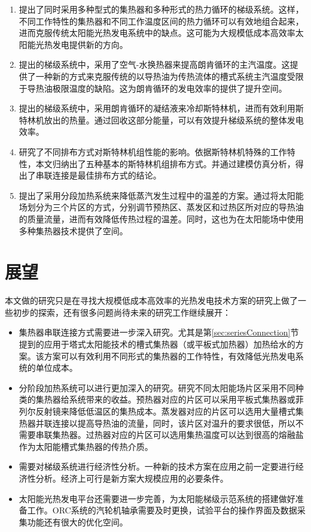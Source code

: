 \begin{enumerate}[label=(\arabic*)]
  \item 提出了同时采用多种型式的集热器和多种形式的热力循环的梯级系统。这样，不同工作特性的集热器和不同工作温度区间的热力循环可以有效地组合起来，进而克服传统太阳能光热发电系统中的缺点。这可能为大规模低成本高效率太阳能光热发电提供新的方向。
  \item 提出的梯级系统中，采用了空气-水换热器来提高朗肯循环的主汽温度。这提供了一种新的方式来克服传统的以导热油为传热流体的槽式系统主汽温度受限于导热油极限温度的缺陷。这为朗肯循环的发电效率的提供了提升空间。
  \item 提出的梯级系统中，采用朗肯循环的凝结液来冷却斯特林机，进而有效利用斯特林机放出的热量。通过回收这部分能量，可以有效提升梯级系统的整体发电效率。
  \item 研究了不同排布方式对斯特林机组性能的影响。依据斯特林机特殊的工作特性，本文归纳出了五种基本的斯特林机组排布方式。并通过建模仿真分析，得出了串联连接是最佳排布方式的结论。 
  \item 提出了采用分段加热系统来降低蒸汽发生过程中的温差的方案。通过将太阳能场划分为三个片区的方式，分别调节预热区、蒸发区和过热区所对应的导热油的质量流量，进而有效降低传热过程的温差。同时，这也为在太阳能场中使用多种集热器技术提供了空间。
\end{enumerate}

\section{展望}
本文做的研究只是在寻找大规模低成本高效率的光热发电技术方案的研究上做了一些初步的探索，还有很多问题尚待未来的研究工作继续展开：
\begin{itemize}
  \item 集热器串联连接方式需要进一步深入研究。尤其是第\ref{sec:seriesConnection}节提到的应用于塔式太阳能技术的槽式集热器（或平板式加热器）加热给水的方案。该方案可以有效利用不同形式的集热器的工作特性，有效降低光热发电系统的单位成本。
  \item 分阶段加热系统可以进行更加深入的研究。研究不同太阳能场片区采用不同种类的集热器给系统带来的收益。预热器对应的片区可以采用平板式集热器或菲列尔反射镜来降低低温区的集热成本。蒸发器对应的片区可以选用大量槽式集热器并联连接以提高导热油的流量，同时，该片区对温升的要求很低，所以不需要串联集热器。过热器对应的片区可以选用集热温度可以达到很高的熔融盐作为太阳能槽式集热器的传热介质。
  \item 需要对梯级系统进行经济性分析。一种新的技术方案在应用之前一定要进行经济性分析。经济上可行是新方案大规模应用的必要条件。
  \item 太阳能光热发电平台还需要进一步完善，为太阳能梯级示范系统的搭建做好准备工作。ORC系统的汽轮机轴承需要及时更换，试验平台的操作界面及数据采集功能还有很大的优化空间。
\end{itemize}